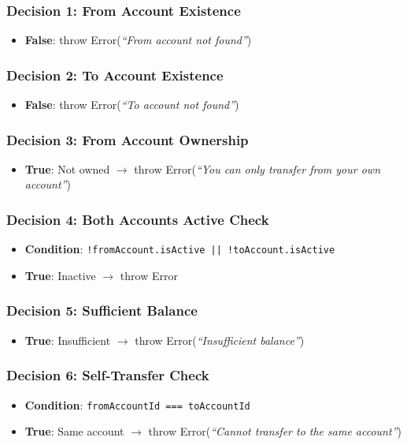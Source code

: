 \subsubsection{Decision 1: From Account Existence}
\begin{itemize}
    \item \textbf{False}: throw Error(\textit{``From account not found''})
\end{itemize}

\subsubsection{Decision 2: To Account Existence}
\begin{itemize}
    \item \textbf{False}: throw Error(\textit{``To account not found''})
\end{itemize}

\subsubsection{Decision 3: From Account Ownership}
\begin{itemize}
    \item \textbf{True}: Not owned $\rightarrow$ throw Error(\textit{``You can only transfer from your own account''})
\end{itemize}

\subsubsection{Decision 4: Both Accounts Active Check}
\begin{itemize}
    \item \textbf{Condition}: \texttt{!fromAccount.isActive || !toAccount.isActive}
    \item \textbf{True}: Inactive $\rightarrow$ throw Error
\end{itemize}

\subsubsection{Decision 5: Sufficient Balance}
\begin{itemize}
    \item \textbf{True}: Insufficient $\rightarrow$ throw Error(\textit{``Insufficient balance''})
\end{itemize}

\subsubsection{Decision 6: Self-Transfer Check}
\begin{itemize}
    \item \textbf{Condition}: \texttt{fromAccountId === toAccountId}
    \item \textbf{True}: Same account $\rightarrow$ throw Error(\textit{``Cannot transfer to the same account''})
\end{itemize}

